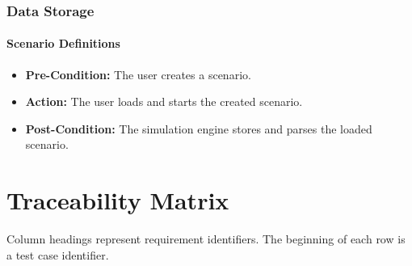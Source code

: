 \documentclass[titlepage]{article}
\newcommand{\testentry}[4]{
    \paragraph{#1}
    \begin{itemize}
        \item \textbf{Pre-Condition:} #2
        \item \textbf{Action:} #3
        \item \textbf{Post-Condition:} #4
    \end{itemize}
}
\begin{document}

\subsubsection{Data Storage%
  \label{data-storage}%
}
    \testentry{Scenario Definitions}{ 
        The user creates a scenario.
    }{
        The user loads and starts the created scenario.
    }{
        The simulation engine stores and parses the loaded scenario.
    }

\pagebreak
\section{Traceability Matrix%
  \label{Traceability Matrix}%
}

Column headings represent requirement identifiers. The beginning of each row is a test case identifier.
\vspace{5pt}
\end{document}
